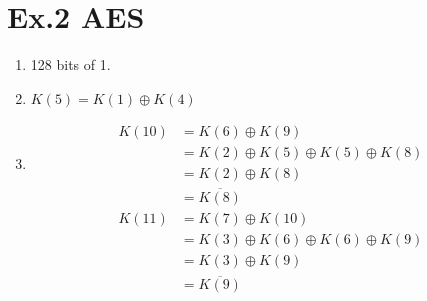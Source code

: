 \documentclass[a4paper]{article}
\begin{document}
\section*{Ex.2 AES}
	\begin{enumerate}
		\item 128 bits of 1.
		\item $K(5) = K(1) \oplus K(4)$
		\item
		\[
		\begin{aligned}
			K(10) &= K(6) \oplus K(9) \\
			&= K(2) \oplus K(5) \oplus K(5) \oplus K(8) \\
			&= K(2) \oplus K(8) \\
			&= \overline{K(8)}
		\end{aligned}
		\]
		\[
		\begin{aligned}
			K(11) &= K(7) \oplus K(10) \\
			&= K(3) \oplus K(6) \oplus K(6) \oplus K(9) \\
			&= K(3) \oplus K(9) \\
			&= \overline{K(9)}
		\end{aligned}
		\]
	\end{enumerate}
\end{document}
